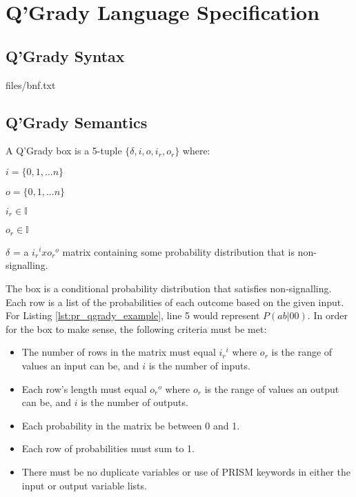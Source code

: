 \documentclass[report.tex]{subfiles}
\begin{document}
\chapter{Q'Grady Language Specification} %
\label{cha:q_grady_specification}
\section{Q'Grady Syntax} %
\label{sec:q_grady_syntax}

{files/bnf.txt} 

\section{Q'Grady Semantics} %
\label{sec:q_grady_semantics}
A Q'Grady box is a 5-tuple \(\{\delta, i, o, i_r, o_r\}\) where:

\(i = \{0, 1, ... n\}\)

\(o = \{0, 1, ... n\}\)

\(i_r \in \mathbb{I}\)

\(o_r \in \mathbb{I}\)

\(\delta\) = a \({i_r}^{i} x {o_r}^{o}\) matrix containing some probability 
distribution that is non-signalling.

The box is a conditional probability distribution that satisfies non-signalling.
Each row is a list of the probabilities of each outcome based on the given
input. For Listing \ref{lst:pr_qgrady_example}, line 5 would represent 
\(P(ab | 00)\). In order for the box to make sense, the following criteria must
be met:
\begin{itemize}
    \item The number of rows in the matrix must equal \({i_r}^{i}\) where
    \(o_r\) is the range of values an input can be, and \(i\) is the number
    of inputs.
    \item Each row's length must equal \({o_r}^{o}\) where \(o_r\) is
    the range of values an output can be, and \(i\) is the number of outputs.
    \item Each probability in the matrix be between 0 and 1.
    \item Each row of probabilities must sum to 1.
    \item There must be no duplicate variables or use of PRISM keywords in
    either the input or output variable lists.
\end{itemize}
\newpage
\end{document}
